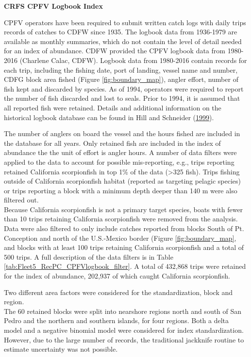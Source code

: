 \documentclass[12pt,]{article}
\begin{document}
\textbf{CRFS CPFV Logbook Index}

CPFV operators have been required to submit written catch logs with
daily trips records of catches to CDFW since 1935. The logbook data from
1936-1979 are available as monthly summaries, which do not contain the
level of detail needed for an index of abundance. CDFW provided the CPFV
logbook data from 1980-2016 (Charlene Calac, CDFW). Logbook data from
1980-2016 contain records for each trip, including the fishing date,
port of landing, vessel name and number, CDFG block area fished (Figure
\ref{fig:boundary_map}), angler effort, number of fish kept and
discarded by species. As of 1994, operators were required to report the
number of fish discarded and lost to seals. Prior to 1994, it is assumed
that all reported fish were retained. Details and additional information
on the historical logbook database can be found in Hill and Schneider
(\protect\hyperlink{ref-Hill1999}{1999}).

The number of anglers on board the vessel and the hours fished are
included in the database for all years. Only retained fish are included
in the index of abundance the the unit of effort is angler hours. A
number of data filters were applied to the data to account for possible
mis-reporting, e.g., trips reporting retained California scorpionfish in
top 1\% of the data (\textgreater{}325 fish). Trips fishing outside of
California scorpionfish habitat (reported as targeting pelagic species)
or trips reporting a block with a minimum depth deeper than 140 m were
also filtered out.\\
Because California scorpionfish is not a primary target species, boats
with fewer than 10 trips retaining California scorpionfish were removed
from the analysis. Data were also filtered to only include catches
reported from blocks South of Pt. Conception and north of the
U.S.-Mexico border (Figure \ref{fig:boundary_map}, and blocks with at
least 100 trips retaining California scorpionfish and a total of 500
trips. A full description of the data filters is in Table
\ref{tab:Fleet5_RecPC_CPFVlogbook_filter}. A total of 432,868 trips were
retained for the index of abundance, 202,937 of which caught California
scorpionfish.

Two different area factors were considered for the standardization,
block and region.\\
The 60 retained blocks were split into nearshore regions north and south
of San Pedro and the northern and southern islands, for four regions.
Both a delta model and a negative binomial model were considered for
index standardization. However, due to the large number of records, the
traditional jackknife routine to estimate uncertainty was not possible.
\end{document}

